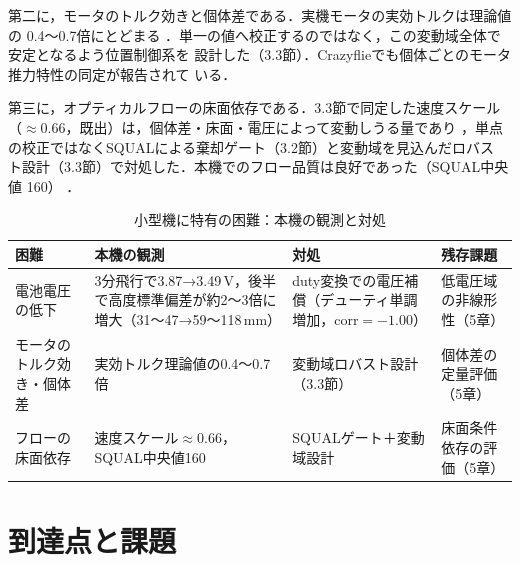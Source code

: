 \documentclass[a4paper,twocolumn,10pt]{ltjsarticle}
\begin{document}
第二に，モータのトルク効きと個体差である．実機モータの実効トルクは理論値の
0.4〜0.7倍にとどまる
．単一の値へ校正するのではなく，この変動域全体で安定となるよう位置制御系を
設計した（3.3節）．Crazyflieでも個体ごとのモータ推力特性の同定が報告されて
いる\cite{forster2015,eschmann2024}．

第三に，オプティカルフローの床面依存である．3.3節で同定した速度スケール
（$\approx 0.66$，既出）は，個体差・床面・電圧によって変動しうる量であり
，単点の校正ではなくSQUALによる棄却ゲート（3.2節）と変動域を見込んだロバス
ト設計（3.3節）で対処した．本機でのフロー品質は良好であった（SQUAL中央値
160）
．

\begin{table}[t]
\centering\scriptsize
\caption{小型機に特有の困難：本機の観測と対処}
\label{tab:difficulties}
\begin{tabularx}{\columnwidth}{@{}X X X X@{}}
\toprule
困難 & 本機の観測 & 対処 & 残存課題 \\
\midrule
電池電圧の低下 &
3分飛行で3.87→3.49\,V，後半で高度標準偏差が約2〜3倍に増大（31〜47→59〜118\,mm） &
duty変換での電圧補償（デューティ単調増加，corr$=-1.00$） &
低電圧域の非線形性（5章） \\
モータのトルク効き・個体差 &
実効トルク理論値の0.4〜0.7倍 &
変動域ロバスト設計（3.3節） &
個体差の定量評価（5章） \\
フローの床面依存 &
速度スケール$\approx$0.66，SQUAL中央値160 &
SQUALゲート＋変動域設計 &
床面条件依存の評価（5章） \\
\bottomrule
\end{tabularx}
\end{table}

\section{到達点と課題}
\end{document}
